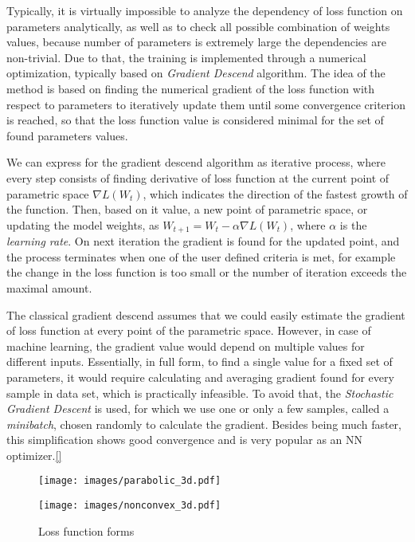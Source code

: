 Typically, it is virtually impossible to analyze the dependency of loss function on parameters analytically, as well as to check all possible combination of weights values, because number of parameters is extremely large the dependencies are non-trivial. 
Due to that, the training is implemented through a numerical optimization, typically based on \textit{Gradient Descend} algorithm. 
The idea of the method is based on finding the numerical gradient of the loss function with respect to parameters to iteratively update them until some convergence criterion is reached, so that the loss function value is considered minimal for the set of found parameters values.

We can express for the gradient descend algorithm as iterative process, where every step consists of finding derivative of loss function at the current point of parametric space $\nabla L(W_{t})$, which indicates the direction of the fastest growth of the function. 
Then, based on it value, a new point of parametric space, or updating the model weights, as $W_{t+1}=W_{t}-\alpha \nabla L(W_{t})$, where $\alpha$ is the \textit{learning rate}.
On next iteration the gradient is found for the updated point, and the process terminates when one of the user defined criteria is met, for example the change in the loss function is too small or the number of iteration exceeds the maximal amount.

The classical gradient descend assumes that we could easily estimate the gradient of loss function at every point of the parametric space.
However, in case of machine learning, the gradient value would depend on multiple values for different inputs.
Essentially, in full form, to find a single value for a fixed set of parameters, it would require calculating and averaging gradient found for every sample in data set, which is practically infeasible.
To avoid that, the \textit{Stochastic Gradient Descent} is used, for which we use one or only a few samples, called a \textit{minibatch}, chosen randomly to calculate the gradient.
Besides being much faster, this simplification shows good convergence and is very popular as an NN optimizer.\ref{}

\begin{figure*}
	\begin{multicols}{2}
		\texttt{[image: images/parabolic\_3d.pdf]}\par
		\texttt{[image: images/nonconvex\_3d.pdf]}\par
	\end{multicols}
	\caption{Loss function forms}
	\label{fig:lossfunc_demo}
\end{figure*}
	
